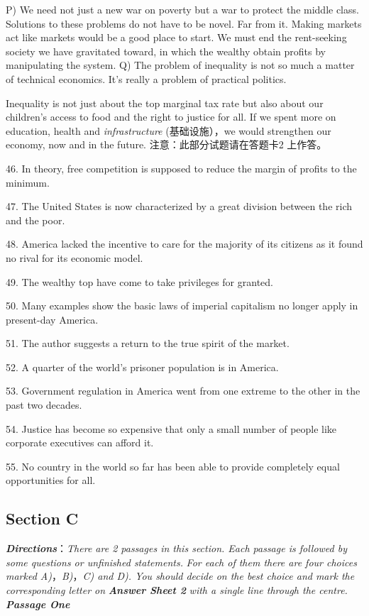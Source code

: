 \documentclass[UTF8,11pt]{ctexart}
\begin{document}
P) We need not just a new war on poverty but a war to protect the middle class. Solutions to these problems do not have to be novel. Far from it. Making markets act like markets would be a good place to start. We must end the rent-seeking society we have gravitated toward, in which the wealthy obtain profits by manipulating the system. Q) The problem of inequality is not so much a matter of technical economics. It’s really a problem of practical politics.


Inequality is not just about the top marginal tax rate but also about our children’s access to food and the right to justice for all. If we spent more on education, health and\textit{ infrastructure} (基础设施），we would strengthen our economy, now and in the future. 注意：此部分试题请在答题卡2 上作答。


46. In theory, free competition is supposed to reduce the margin of profits to the minimum.


47. The United States is now characterized by a great division between the rich and the poor.


48. America lacked the incentive to care for the majority of its citizens as it found no rival for its economic model.


49. The wealthy top have come to take privileges for granted.


50. Many examples show the basic laws of imperial capitalism no longer apply in present-day America.


51. The author suggests a return to the true spirit of the market.


52. A quarter of the world’s prisoner population is in America.


53. Government regulation in America went from one extreme to the other in the past two decades.


54. Justice has become so expensive that only a small number of people like corporate executives can afford it.


55. No country in the world so far has been able to provide completely equal opportunities for all.


\subsection*{\textbf{Section C}}


\textbf{\textit{Directions}}：\textit{There are 2 passages in this section. Each passage is followed by some questions or unfinished statements.} \textit{For each of them there are four choices marked A)}，\textit{B)}，\textit{C) and D). You should decide on the best choice and mark the} \textit{corresponding letter on}\textbf{\textit{ Answer Sheet 2}}\textit{ with a single line through the centre.}\textbf{\textit{ Passage One}}
\end{document}
